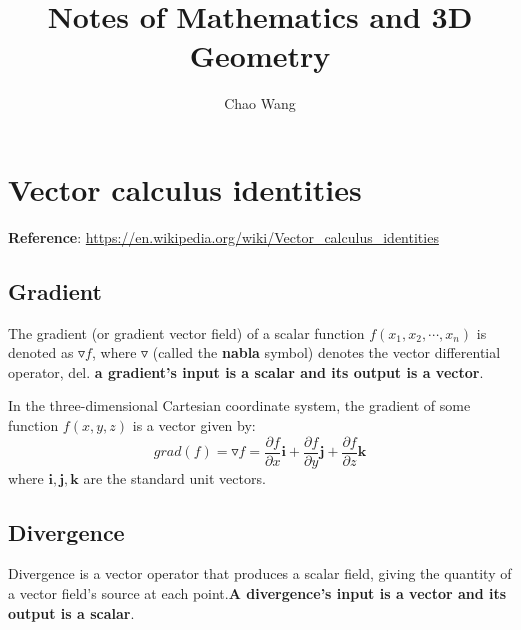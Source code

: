 \documentclass[12pt]{article}
\numberwithin{equation}{section}
\begin{document}


\title{Notes of Mathematics and 3D Geometry}%
\author{Chao Wang} %

\maketitle

\newpage

\tableofcontents

\newpage

\section{Vector calculus identities}

\textbf{Reference}: \url{https://en.wikipedia.org/wiki/Vector_calculus_identities}

\subsection{Gradient}

The gradient (or gradient vector field) of a scalar function $f(x_1, x_2, \cdots, x_n)$ is denoted as $\triangledown f$, where $\triangledown$ (called the \textbf{nabla} symbol) denotes the vector differential operator, del. \textbf{a gradient's input is a scalar and its output is a vector}. 

In the three-dimensional Cartesian coordinate system, the gradient of some function $f(x,y,z)$ is a vector given by:
\begin{equation}
grad(f) = \triangledown f = \frac{\partial f}{\partial x} \mathbf{i} + \frac{\partial f}{\partial y} \mathbf{j} + \frac{\partial f}{\partial z} \mathbf{k}
\end{equation}
where $\mathbf{i,j,k}$ are the standard unit vectors.

\subsection{Divergence}

Divergence is a vector operator that produces a scalar field, giving the quantity of a vector field's source at each point.\textbf{A divergence's input is a vector and its output is a scalar}. 
\end{document}
